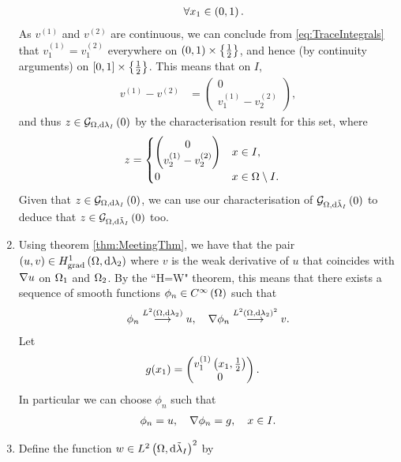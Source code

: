 \documentclass[11pt]{report}
\theoremstyle{plain}
\newcommand{\tlambda}{\tilde{\lambda}}
\begin{document}
\begin{enumerate}
\begin{align}
		\quad \forall x_1\in\left( 0,1 \right).
	\end{align}
	As $v^{(1)}$ and $v^{(2)}$ are continuous, we can conclude from \eqref{eq:TraceIntegrals} that $v^{(1)}_1 = v^{(2)}_1$ everywhere on $\left( 0,1 \right)\times\left\{ \frac{1}{2} \right\}$, and hence (by continuity arguments) on $\left[ 0,1 \right]\times\left\{ \frac{1}{2} \right\}$.
	This means that on $I$,
	\begin{align}
		v^{(1)} - v^{(2)} &= \begin{pmatrix} 0 \\ v^{(1)}_1 - v^{(2)}_2 \end{pmatrix},
	\end{align}
	and thus $z\in\mathcal{G}_{ \Omega, \mathrm{d}\lambda_I}\left( 0 \right)$ by the characterisation result for this set, where
	\begin{align}
		z &= \begin{cases}
		\begin{pmatrix} 0 \\ v^{(1)}_2 - v^{(2)}_2 \end{pmatrix} & x\in I, \\
		0 & x\in\Omega\setminus I.
		\end{cases}
	\end{align}
	Given that $z\in\mathcal{G}_{ \Omega, \mathrm{d}\lambda_I}\left( 0 \right)$, we can use our characterisation of $\gradZero{\ddom}{\tlambda_I}$ to deduce that $z\in\gradZero{\ddom}{\tlambda_I}$ too.
	\item Using theorem \ref{thm:MeetingThm}, we have that the pair $\left( u,v \right)\in H^1_\mathrm{grad}\left( \Omega, \mathrm{d}\lambda_2 \right)$ where $v$ is the weak derivative of $u$ that coincides with $\nabla u$ on $\Omega_1$ and $\Omega_2$.
	By the ``H=W" theorem, this means that there exists a sequence of smooth functions $\phi_n\in C^{\infty}\left( \Omega \right)$ such that
	\begin{align}
		\phi_n \overset{L^{2}\left( \Omega,\mathrm{d}\lambda_2 \right)}{\longrightarrow} u, \quad \nabla\phi_n\overset{L^{2}\left( \Omega,\mathrm{d}\lambda_2 \right)^2}{\longrightarrow}v.
	\end{align}
	Let
	\begin{align}
		g(x_1) &= 
		\begin{pmatrix}
			v^{(1)}_1\left( x_1,\frac{1}{2} \right) \\
			0
		\end{pmatrix}.
	\end{align}
	In particular we can choose $\phi_n$ such that
	\begin{align} \label{eq:ApproxSeqRequirements}
		\phi_n = u, \quad \nabla\phi_n = g, \quad x\in I.
	\end{align}
	\item Define the function $w\in\ltwo{\ddom}{\tlambda_I}^2$ by

\end{enumerate}
\end{document}
